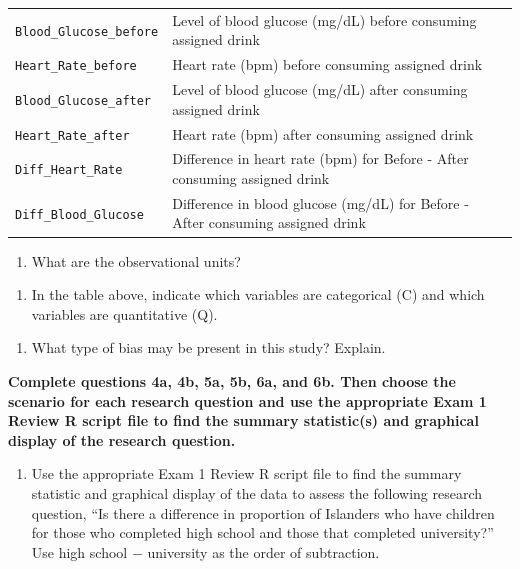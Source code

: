 \documentclass[
]{report}
\providecommand{\tightlist}{%
  \setlength{\itemsep}{0pt}\setlength{\parskip}{0pt}}
\begin{document}
\begin{longtable}[]{@{}
  >{\raggedright\arraybackslash}p{}
  >{\raggedright\arraybackslash}p{}@{}}
\texttt{Blood\_Glucose\_before} & Level of blood glucose (mg/dL) before consuming assigned drink \\
\texttt{Heart\_Rate\_before} & Heart rate (bpm) before consuming assigned drink \\
\texttt{Blood\_Glucose\_after} & Level of blood glucose (mg/dL) after consuming assigned drink \\
\texttt{Heart\_Rate\_after} & Heart rate (bpm) after consuming assigned drink \\
\texttt{Diff\_Heart\_Rate} & Difference in heart rate (bpm) for Before - After consuming assigned drink \\
\texttt{Diff\_Blood\_Glucose} & Difference in blood glucose (mg/dL) for Before - After consuming assigned drink \\
\end{longtable}

\begin{enumerate}
\def\labelenumi{\arabic{enumi}.}
\tightlist
\item
  What are the observational units?
\end{enumerate}

\vspace{0.1in}

\begin{enumerate}
\def\labelenumi{\arabic{enumi}.}
\setcounter{enumi}{1}
\tightlist
\item
  In the table above, indicate which variables are categorical (C) and which variables are quantitative (Q).
\end{enumerate}

\vspace{0.1in}

\begin{enumerate}
\def\labelenumi{\arabic{enumi}.}
\setcounter{enumi}{2}
\tightlist
\item
  What type of bias may be present in this study? Explain.
\end{enumerate}

\vspace{0.5in}

\newpage

\textbf{Complete questions 4a, 4b, 5a, 5b, 6a, and 6b. Then choose the scenario for each research question and use the appropriate Exam 1 Review R script file to find the summary statistic(s) and graphical display of the research question.}

\begin{enumerate}
\def\labelenumi{\arabic{enumi}.}
\setcounter{enumi}{3}
\tightlist
\item
  Use the appropriate Exam 1 Review R script file to find the summary statistic and graphical display of the data to assess the following research question, ``Is there a difference in proportion of Islanders who have children for those who completed high school and those that completed university?'' Use high school \(-\) university as the order of subtraction.
\end{enumerate}
\end{document}
